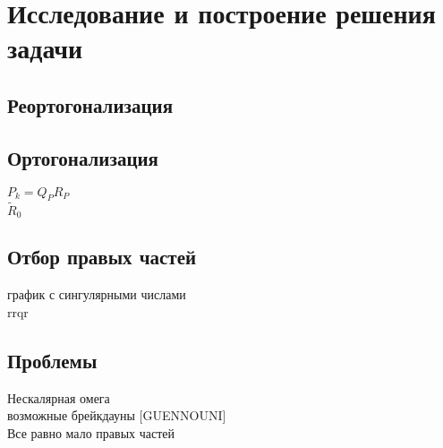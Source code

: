 \section{Исследование и построение решения задачи}
\label{sec:Chapter3} 

\subsection{Реортогонализация}
\subsection{Ортогонализация}
$P_k = Q_PR_P$\\
$\tilde{R}_0$\\

\subsection{Отбор правых частей}
график с сингулярными числами \\
rrqr
\subsection{Проблемы}
Нескалярная омега\\
возможные брейкдауны [GUENNOUNI]\\
Все равно мало правых частей

\newpage
